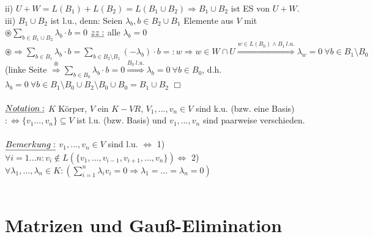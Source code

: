\documentclass[fleqn, a4paper, 11pt]{article}
\begin{document}
ii) $U+W=L(B_1)+L(B_2)=L(B_1\cup B_2)\Rightarrow B_1\cup B_2$ ist ES von $U+W$.\\
iii) $B_1\cup B_2$ ist l.u., denn: Seien $\lambda_b,b\in B_2\cup B_1$ Elemente aus $V$ mit $\circledast \sum\limits_{b\in B_1\cup B_2} \lambda_b \cdot b=0$ $\uline{zz:}$ alle $\lambda_b=0$\\
$\circledast \Rightarrow \sum\limits_{b\in B_1} \lambda_b\cdot b=\sum\limits_{b\in B_2\setminus B_1} (-\lambda_b)\cdot b=:w\Rightarrow w\in W\cap U\stackrel{w\in L(B_0)\wedge B_1\:l.u.}{\Rightarrow} \lambda_w =0 \: \forall b\in B_1\setminus B_0$ (linke Seite $\stackrel{\circledast}{\Rightarrow} \sum\limits_{b\in B_0} \lambda_b\cdot b=0\stackrel{B_0\:l.u.}{\Rightarrow} \lambda_b=0 \: \forall b\in B_0$, d.h. $\lambda_b=0 \: \forall b\in B_1\setminus B_0\cup B_2\setminus B_0\cup B_0= B_1\cup B_2$ \hfill $\Box$\\
\\
$\uline{Notation:}$ $K$ K\"orper, $V$ ein $K-VR$, $V_1,...,v_n\in V$ sind k.u. (bzw. eine Basis) $:\Leftrightarrow \{v_1...,v_n\}\subseteq V$ ist l.u. (bzw. Basis) und $v_1,...,v_n$ sind paarweise verschieden.\\
\\
$\uline{Bemerkung:}$ $v_1,...,v_n\in V$ sind l.u. $\Leftrightarrow$ 1) $\forall i=1...n:v_i \notin L(\{v_1,...,v_{i-1},v_{i+1},...,v_n\}) \Leftrightarrow $ 2) $\forall \lambda_1,...,\lambda_n\in K:(\sum\limits_{i=1}^n \lambda_i v_i=0\Rightarrow \lambda_1 =...=\lambda_n =0)$\\
\\
\newpage
\section{Matrizen und Gau\ss{}-Elimination}
\end{document}
